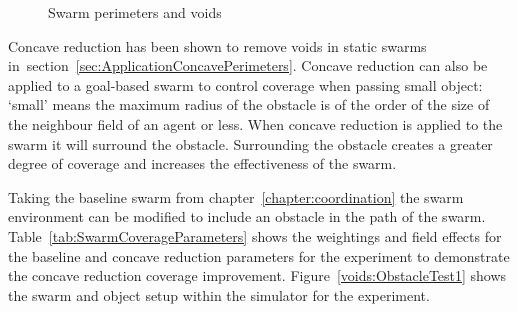 \begin{figure}[H]
\centering
{}
\caption{Swarm perimeters and voids}
\label{fig:SwarmObjectVoids}
\end{figure}
 
Concave reduction has been shown to remove voids in static swarms in~section~\ref{sec:ApplicationConcavePerimeters}. Concave reduction can also be applied to a goal-based swarm to control coverage when passing small object: `small' means the maximum radius of the obstacle is of the order of the size of the neighbour field of an agent or less. When concave reduction is applied to the swarm it will surround the obstacle. Surrounding the obstacle creates a greater degree of coverage and increases the effectiveness of the swarm.

Taking the baseline swarm from chapter~\ref{chapter:coordination} the swarm environment can be modified to include an obstacle in the path of the swarm. Table~\ref{tab:SwarmCoverageParameters} shows the weightings and field effects for the baseline and concave reduction parameters for the experiment to demonstrate the concave reduction coverage improvement. Figure~\ref{voids:ObstacleTest1} shows the swarm and object setup within the simulator for the experiment.

